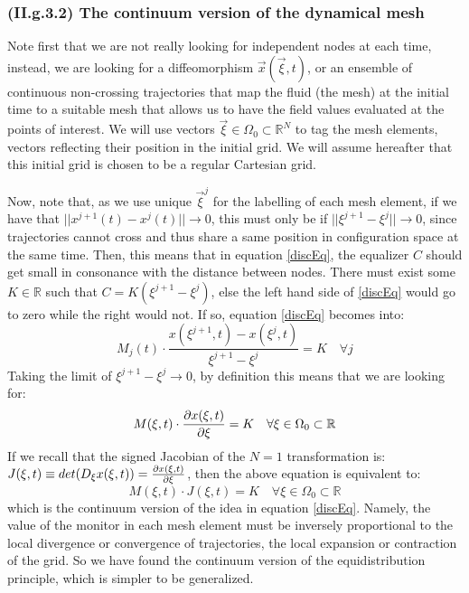 \documentclass[11pt, a4paper]{article} %
\newcommand{\R}{\mathbb{R}} %
\begin{document}
\subsubsection*{(II.g.3.2) The continuum version of the dynamical mesh\vspace{-0.2cm}}
Note first that we are not really looking for independent nodes at each time, instead, we are looking for a diffeomorphism $\vec{x}(\vec{\xi},t)$, or an ensemble of continuous non-crossing trajectories that map the fluid (the mesh) at the initial time to a suitable mesh that allows us to have the field values evaluated at the points of interest. We will use vectors $\vec{\xi}\in\Omega_0\subset\R^N$ to tag the mesh elements, vectors reflecting their position in the initial grid. We will assume hereafter that this initial grid is chosen to be a regular Cartesian grid.

Now, note that, as we use unique $\vec{\xi}^j$ for the labelling of each mesh element, if we have that $||x^{j+1}(t)-x^j(t)||\rightarrow 0$, this must only be if $||\xi^{j+1}-\xi^j||\rightarrow 0$, since trajectories cannot cross and thus share a same position in configuration space at the same time. Then, this means that in equation \eqref{discEq}, the equalizer $C$ should get small in consonance with the distance between nodes. There must exist some $K\in\R$ such that $C=K(\xi^{j+1}-\xi^j)$, else the left hand side of \eqref{discEq} would go to zero while the right would not. If so, equation \eqref{discEq} becomes into:
\begin{equation}
M_j(t)\cdot \frac{x(\xi^{j+1},t)-x(\xi^{j},t)}{\xi^{j+1}-\xi^j}=K \quad \forall j
\end{equation}
Taking the limit of $\xi^{j+1}-\xi^j\rightarrow 0$, by definition this means that we are looking for:
\begin{equation}\label{contEq}
M(\xi,t)\cdot \pdv{x(\xi,t)}{\xi}=K \quad \forall \xi\in \Omega_0\subset \R
\end{equation}
If we recall that the signed Jacobian of the $N=1$ transformation is: $J(\xi,t)\equiv det(D_{\xi}x(\xi,t))=\pdv{x(\xi,t)}{\xi}$, then the above equation is equivalent to:
\begin{equation}
M(\xi,t)\cdot J(\xi,t)=K \quad \forall \xi\in \Omega_0\subset \R
\end{equation}
which is the continuum version of the idea in equation \eqref{discEq}. Namely, the value of the monitor in each mesh element must be inversely proportional to the local divergence or convergence of trajectories, the local expansion or contraction of the grid. So we have found the continuum version of the equidistribution principle, which is simpler to be generalized.
\end{document}
